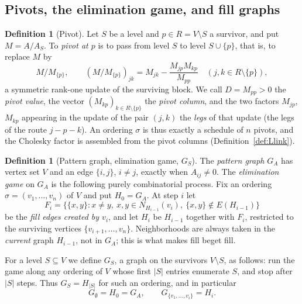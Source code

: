 \documentclass[11pt]{article}
\theoremstyle{plain}
\theoremstyle{definition}
\newtheorem{definition}[theorem]{Definition}
\theoremstyle{remark}
\begin{document}
\begin{humanaiblock}
\subsection{Pivots, the elimination game, and fill graphs}\label{sec:pivots}

\begin{definition}[Pivot]\label{def:pivot}
Let $S$ be a level and $p\in R=V\setminus S$ a survivor, and put $M=A/A_S$. To \emph{pivot at $p$} is
to pass from level $S$ to level $S\cup\{p\}$, that is, to replace $M$ by
\[
M/M_{\{p\}},\qquad (M/M_{\{p\}})_{jk}=M_{jk}-\frac{M_{jp}M_{kp}}{M_{pp}}
\quad (j,k\in R\setminus\{p\}),
\]
a symmetric rank-one update of the surviving block. We call $D=M_{pp}>0$ the \emph{pivot value}, the
vector $(M_{kp})_{k\in R\setminus\{p\}}$ the \emph{pivot column}, and the two factors $M_{jp}$,
$M_{kp}$ appearing in the update of the pair $(j,k)$ the \emph{legs} of that update (the legs of the
route $j-p-k$). An ordering $\sigma$ is thus exactly a schedule of $n$ pivots, and the Cholesky
factor is assembled from the pivot columns (Definition~\ref{def:Llink}).
\end{definition}

\begin{definition}[Pattern graph, elimination game, $G_S$]\label{def:fill}
The \emph{pattern graph} $G_A$ has vertex set $V$ and an edge $\{i,j\}$, $i\neq j$, exactly when
$A_{ij}\neq0$. The \emph{elimination game} on $G_A$ is the following purely combinatorial process.
Fix an ordering $\sigma=(v_1,\dots,v_n)$ of $V$ and put $H_0=G_A$. At step $i$ let
\[
  F_i=\bigl\{\{x,y\}: x\neq y,\ x,y\in N_{H_{i-1}}(v_i),\ \{x,y\}\notin E(H_{i-1})\bigr\}
\]
be the \emph{fill edges created by $v_i$}, and let $H_i$ be $H_{i-1}$ together with $F_i$, restricted
to the surviving vertices $\{v_{i+1},\dots,v_n\}$. Neighborhoods are always taken in the
\emph{current} graph $H_{i-1}$, not in $G_A$; this is what makes fill beget fill.

For a level $S\subseteq V$ we define $G_S$, a graph on the survivors $V\setminus S$, as follows: run
the game along any ordering of $V$ whose first $|S|$ entries enumerate $S$, and stop after $|S|$
steps. Thus $G_S=H_{|S|}$ for such an ordering, and in particular
\[
  G_\emptyset=H_0=G_A,\qquad G_{\{v_1,\dots,v_i\}}=H_i .
\]

\end{definition}


\end{humanaiblock}
\end{document}
